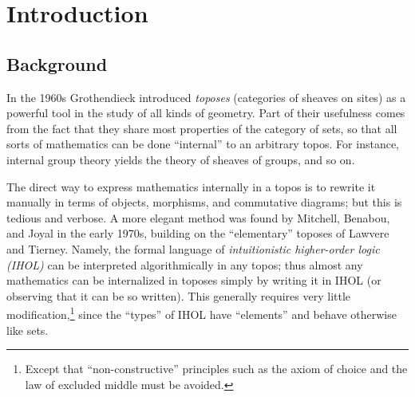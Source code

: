\section{Introduction}
\label{sec:introduction}

\subsection{Background}
\label{sec:background}

In the 1960s Grothendieck introduced \emph{toposes} (categories of sheaves on sites) as a powerful tool in the study of all kinds of geometry.
Part of their usefulness comes from the fact that they share most properties of the category of sets, so that all sorts of mathematics can be done ``internal'' to an arbitrary topos.
For instance, internal group theory yields the theory of sheaves of groups, and so on.

The direct way to express mathematics internally in a topos is to rewrite it manually in terms of objects, morphisms, and commutative diagrams; but this is tedious and verbose.
A more elegant method was found by Mitchell, Benabou, and Joyal in the early 1970s, building on the ``elementary'' toposes of Lawvere and Tierney.
Namely, the formal language of \emph{intuitionistic higher-order logic (IHOL)} can be interpreted algorithmically in any topos; thus almost any mathematics can be internalized in toposes simply by writing it in IHOL (or observing that it can be so written).
This generally requires very little modification,\footnote{Except that ``non-constructive'' principles such as the axiom of choice and the law of excluded middle must be avoided.} since the ``types'' of IHOL have ``elements'' and behave otherwise like sets.

